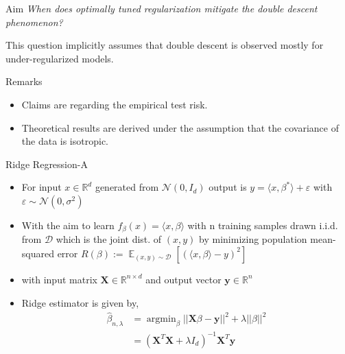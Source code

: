 \documentclass[aspectratio=169]{beamer}
\begin{document}
\begin{frame}{Aim}
\color{Black}
  \centering
  \textit{When does optimally tuned regularization mitigate the double descent phenomenon?}

\vspace{3cm}

\color{Pink}{P.S.} This question implicitly assumes that double descent is observed mostly for under-regularized models.
  
\end{frame}

\begin{frame}{Remarks}

  \begin{itemize}
    \item Claims are regarding the empirical test risk.
    \item Theoretical results are derived under the assumption that the covariance of the data is isotropic.
  \end{itemize}

\end{frame}

\begin{frame}{Ridge Regression-A}

  \begin{itemize}
    \item For input $x\in\mathbb{R}^d$ generated from $\mathcal{N}(0, I_d)$ output is $y=\langle x,\beta^* \rangle + \varepsilon$ with $\varepsilon \sim \mathcal{N}(0,\sigma^2)$
    \item With the aim  to learn $f_\beta(x)=\langle x,\beta \rangle$ with n training samples drawn i.i.d. from $\mathcal{D}$ which is the joint dist. of $(x,y)$ by minimizing population mean-squared error $R(\beta):= \displaystyle\mathop{\mathbb{E}}_{(x,y)\sim\mathcal{D}}[(\langle x,\beta \rangle -y)^2]$ 
    \item with input matrix $\boldsymbol{X}\in\mathbb{R}^{n \times d}$ and output vector $\boldsymbol{y}\in\mathbb{R}^n$
    \item Ridge estimator is given by,
      \begin{align}
        \hat{\beta}_{n,\lambda} &= \displaystyle\mathop{\text{argmin}}_\beta ||\boldsymbol{X}\beta-\boldsymbol{y}||^2 + \lambda||\beta||^2 \\
      &= (\boldsymbol{X}^T\boldsymbol{X}+\lambda I_d)^{-1}\boldsymbol{X}^T\boldsymbol{y}
      \end{align}
  \end{itemize}

\end{frame}
\end{document}
